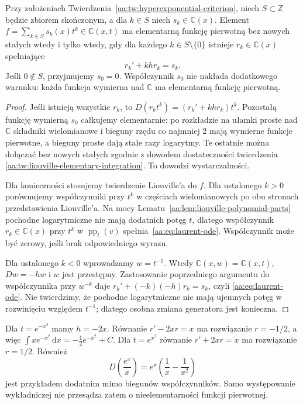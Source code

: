 \begin{twierdzenie}
\label{aa:tw:laurent-hyperexp-criterion}
Przy założeniach
Twierdzenia~\ref{aa:tw:hyperexponential-criterion},
niech $S\subset\mathbb Z$ będzie zbiorem
skończonym, a dla $k\in S$ niech
$s_k\in\mathbb C(x)$. Element
$f=\sum_{k\in S}s_k(x)t^k\in\mathbb C(x,t)$
ma elementarną funkcję pierwotną bez nowych
stałych wtedy i tylko wtedy, gdy dla
każdego $k\in S\setminus\{0\}$ istnieje
$r_k\in\mathbb C(x)$ spełniające
\begin{equation}\label{aa:eq:laurent-ode}
 r_k'+khr_k=s_k.
\end{equation}
Jeśli $0\notin S$, przyjmujemy $s_0=0$.
Współczynnik $s_0$ nie nakłada dodatkowego
warunku: każda funkcja wymierna nad
$\mathbb C$ ma elementarną funkcję pierwotną.
\end{twierdzenie}
\begin{proof}
Jeśli istnieją wszystkie $r_k$,
to $D(r_kt^k)=(r_k'+khr_k)t^k$.
Pozostałą funkcję wymierną $s_0$ całkujemy
elementarnie: po rozkładzie na ułamki proste
nad $\mathbb C$ składniki wielomianowe
i bieguny rzędu co najmniej $2$ mają
wymierne funkcje pierwotne, a bieguny proste
dają stałe razy logarytmy. Te ostatnie
można dołączać bez nowych stałych zgodnie
z dowodem dostateczności twierdzenia
\ref{aa:tw:liouville-elementary-integration}.
To dowodzi wystarczalności.

Dla konieczności stosujemy twierdzenie
Liouville'a do $f$. Dla ustalonego $k>0$
porównujemy współczynniki przy $t^k$
w częściach wielomianowych po obu stronach
przedstawienia Liouville'a. Na mocy
Lematu~\ref{aa:lem:liouville-polynomial-parts}
pochodne logarytmiczne nie mają
dodatnich potęg $t$, dlatego
współczynnik $r_k\in\mathbb C(x)$ przy
$t^k$ w $\operatorname{pp}_t(v)$
spełnia~\eqref{aa:eq:laurent-ode}.
Współczynnik może być zerowy, jeśli
brak odpowiedniego wyrazu.

Dla ustalonego $k<0$ wprowadzamy
$w=t^{-1}$. Wtedy
$\mathbb C(x,w)=\mathbb C(x,t)$,
$Dw=-hw$ i $w$ jest przestępny.
Zastosowanie poprzedniego argumentu
do współczynnika przy $w^{-k}$ daje
$r_k'+(-k)(-h)r_k=s_k$, czyli
\eqref{aa:eq:laurent-ode}.
Nie twierdzimy, że pochodne logarytmiczne
nie mają ujemnych potęg w rozwinięciu
względem $t^{-1}$; dlatego osobna zmiana
generatora jest konieczna.
\end{proof}

\begin{przyklad}
\label{aa:prz:hyperexp-positive-controls}
Dla $t=e^{-x^2}$ mamy $h=-2x$.
Równanie $r'-2xr=x$ ma rozwiązanie
$r=-1/2$, a więc
$\int x e^{-x^2}\,\mathrm dx=-\frac12e^{-x^2}+C$.
Dla $t=e^{x^2}$ równanie
$r'+2xr=x$ ma rozwiązanie $r=1/2$.
Również
\[
 D\left(\frac{e^x}{x}\right)
 =e^x\left(\frac1x-\frac1{x^2}\right)
\]
jest przykładem dodatnim mimo biegunów
współczynników. Samo występowanie
wykładniczej nie przesądza zatem
o nieelementarności funkcji pierwotnej.
\end{przyklad}

